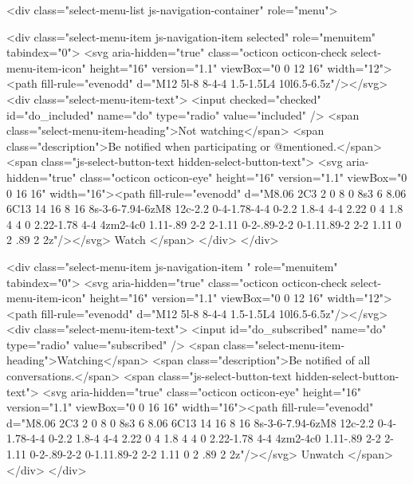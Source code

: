               <div class="select-menu-list js-navigation-container" role="menu">

                <div class="select-menu-item js-navigation-item selected" role="menuitem" tabindex="0">
                  <svg aria-hidden="true" class="octicon octicon-check select-menu-item-icon" height="16" version="1.1" viewBox="0 0 12 16" width="12"><path fill-rule="evenodd" d="M12 5l-8 8-4-4 1.5-1.5L4 10l6.5-6.5z"/></svg>
                  <div class="select-menu-item-text">
                    <input checked="checked" id="do_included" name="do" type="radio" value="included" />
                    <span class="select-menu-item-heading">Not watching</span>
                    <span class="description">Be notified when participating or @mentioned.</span>
                    <span class="js-select-button-text hidden-select-button-text">
                      <svg aria-hidden="true" class="octicon octicon-eye" height="16" version="1.1" viewBox="0 0 16 16" width="16"><path fill-rule="evenodd" d="M8.06 2C3 2 0 8 0 8s3 6 8.06 6C13 14 16 8 16 8s-3-6-7.94-6zM8 12c-2.2 0-4-1.78-4-4 0-2.2 1.8-4 4-4 2.22 0 4 1.8 4 4 0 2.22-1.78 4-4 4zm2-4c0 1.11-.89 2-2 2-1.11 0-2-.89-2-2 0-1.11.89-2 2-2 1.11 0 2 .89 2 2z"/></svg>
                      Watch
                    </span>
                  </div>
                </div>

                <div class="select-menu-item js-navigation-item " role="menuitem" tabindex="0">
                  <svg aria-hidden="true" class="octicon octicon-check select-menu-item-icon" height="16" version="1.1" viewBox="0 0 12 16" width="12"><path fill-rule="evenodd" d="M12 5l-8 8-4-4 1.5-1.5L4 10l6.5-6.5z"/></svg>
                  <div class="select-menu-item-text">
                    <input id="do_subscribed" name="do" type="radio" value="subscribed" />
                    <span class="select-menu-item-heading">Watching</span>
                    <span class="description">Be notified of all conversations.</span>
                    <span class="js-select-button-text hidden-select-button-text">
                      <svg aria-hidden="true" class="octicon octicon-eye" height="16" version="1.1" viewBox="0 0 16 16" width="16"><path fill-rule="evenodd" d="M8.06 2C3 2 0 8 0 8s3 6 8.06 6C13 14 16 8 16 8s-3-6-7.94-6zM8 12c-2.2 0-4-1.78-4-4 0-2.2 1.8-4 4-4 2.22 0 4 1.8 4 4 0 2.22-1.78 4-4 4zm2-4c0 1.11-.89 2-2 2-1.11 0-2-.89-2-2 0-1.11.89-2 2-2 1.11 0 2 .89 2 2z"/></svg>
                        Unwatch
                    </span>
                  </div>
                </div>

